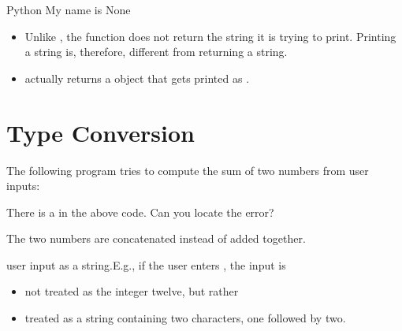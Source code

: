 \documentclass[letterpaper,10pt,english]{sphinxmanual}
\begin{document}
\begin{sphinxVerbatim}[commandchars=\\\{\}]
Python
My name is None
\end{sphinxVerbatim}
\begin{itemize}
\item {} 
Unlike , the function  does not return the string it is trying to print. Printing a string is, therefore, different from returning a string.

\item {} 
 actually returns a  object that gets printed as .

\end{itemize}


\section{Type Conversion}
\label{\detokenize{Lecture2/Values and Variables:type-conversion}}
The following program tries to compute the sum of two numbers from user inputs:

\begin{sphinxVerbatim}[commandchars=\\\{\}]
  
  
      
\end{sphinxVerbatim}

 There is a  in the above code. Can you locate the error?

The two numbers are concatenated instead of added together.

  user input as a string.E.g., if the user enters , the input is
\begin{itemize}
\item {} 
not treated as the integer twelve, but rather

\item {} 
treated as a string containing two characters, one followed by two.

\end{itemize}
\end{document}

